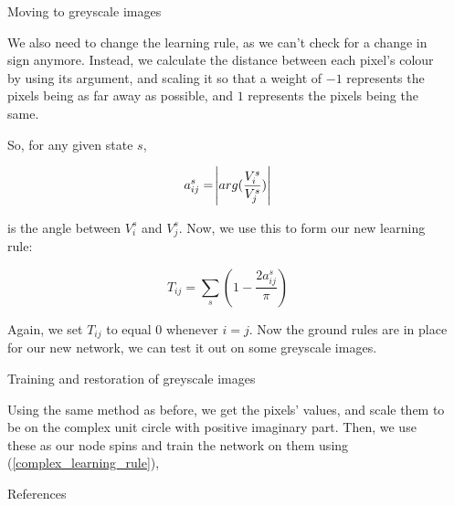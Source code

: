 \documentclass[25pt, a0paper, portrait]{beamer}
\newlength{\sepwidth}
\newlength{\colwidth}
\newcommand{\separatorcolumn}{\begin{column}{\sepwidth}\end{column}}
\begin{document}
\begin{frame}[t]
\begin{columns}[t]
\begin{column}{\colwidth}
\begin{block}{Moving to greyscale images}

    We also need to change the learning rule, as we can't check for a change in sign anymore.
    Instead, we calculate the distance between each pixel's colour by using its argument, and
    scaling it so that a weight of $-1$ represents the pixels being as far away as possible,
    and $1$ represents the pixels being the same.

    So, for any given state $s$,

    \begin{equation*}
      a^s_{ij} = \abs{arg(\frac{V^s_i}{V^s_j})}
    \end{equation*}

    is the angle between $V^s_i$ and $V^s_j$. Now, we use this to form our new learning rule:
    
    \begin{equation} \label{complex_learning_rule}
      T_{ij} = \sum_{s}(1 - \frac{2a^s_{ij}}{\pi})
    \end{equation}

    Again, we set $T_{ij}$ to equal $0$ whenever $i = j$. Now the ground rules are in place
    for our new network, we can test it out on some greyscale images.

  \end{block}

  \begin{block}{Training and restoration of greyscale images} \small

    Using the same method as before, we get the pixels' values, and scale them to be on the
    complex unit circle with positive imaginary part. Then, we use these as our node spins and
    train the network on them using (\ref{complex_learning_rule}), 

  \end{block}

  \begin{block}{References}
    \footnotesize{}

  \end{block}

\end{column}

\separatorcolumn
\end{columns}
\end{frame}
\end{document}
